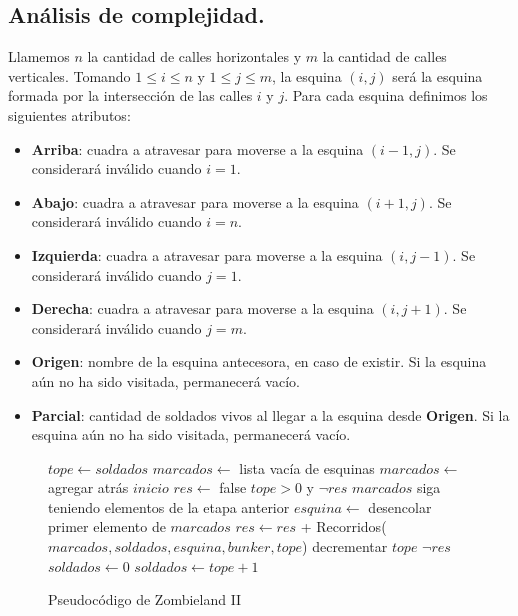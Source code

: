 
\subsection{Análisis de complejidad.}

\vspace*{0.3cm}

Llamemos $n$ la cantidad de calles horizontales y $m$ la cantidad de calles verticales.  Tomando $1 \leq i \leq n$ y $1 \leq j \leq m$, la esquina $(i,j)$ será la esquina formada por la intersección de las calles $i$ y $j$.  Para cada esquina definimos los siguientes atributos:

\begin{itemize}
	\item {\bf Arriba}: cuadra a atravesar para moverse a la esquina $(i-1,j)$. Se considerará inválido cuando $i = 1$.
	\item {\bf Abajo}: cuadra a atravesar para moverse a la esquina $(i+1,j)$. Se considerará inválido cuando $i = n$.
	\item {\bf Izquierda}: cuadra a atravesar para moverse a la esquina $(i,j-1)$. Se considerará inválido cuando $j = 1$.
	\item {\bf Derecha}: cuadra a atravesar para moverse a la esquina $(i,j+1)$. Se considerará inválido cuando $j = m$.
	\item {\bf Origen}: nombre de la esquina antecesora, en caso de existir.  Si la esquina aún no ha sido visitada, permanecerá vacío.
	\item {\bf Parcial}: cantidad de soldados vivos al llegar a la esquina desde {\bf Origen}. Si la esquina aún no ha sido visitada, permanecerá vacío.
\end{itemize}

\begin{figure}[!ht]
\begin{codebox}
\li $tope \leftarrow soldados$
\li $marcados \leftarrow$ lista vacía de esquinas
\li $marcados \leftarrow$ agregar atrás $inicio$
\li $res \leftarrow$ false
\li \While $tope > 0$ y $\neg res$
\li		\Do \While $marcados$ siga teniendo elementos de la etapa anterior
\li				\Do
					$esquina \leftarrow$ desencolar primer elemento de $marcados$
\li					$res \leftarrow res$ + {\sc Recorridos}($marcados,soldados,esquina,bunker,tope$)
				\End
\li			decrementar $tope$
		\End
\li	\If $\neg res$
\li		\Do $soldados \leftarrow 0$ \End
\li		\Else 
\li			\Do $soldados \leftarrow tope + 1$
			\End
		\End
\end{codebox} 
\caption{Pseudocódigo de Zombieland II}\label{code:zombieland}
\end{figure}


